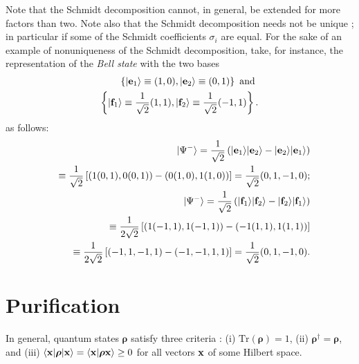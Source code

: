 Note that the Schmidt decomposition cannot, in general, be extended for more factors than two.
Note also that the Schmidt decomposition needs not be unique \cite{ekert:415};
in particular if some of the Schmidt coefficients $\sigma_i$ are equal.
For the sake of an example of nonuniqueness of the Schmidt decomposition,
take, for instance, the representation of the {\em Bell state} 
with the two bases
\begin{equation}
\begin{split}
\left\{
\vert {\bf e}_1\rangle \equiv (1,0),
\vert {\bf e}_2\rangle \equiv (0,1)
\right\}
\textrm{ and }\\
\left\{
\vert {\bf f}_1\rangle \equiv \frac{1}{\sqrt{2}}(1,1),
\vert {\bf f}_2\rangle \equiv \frac{1}{\sqrt{2}}(-1,1)
\right\}.
\end{split}
\end{equation}
as follows:
\begin{equation}
\begin{split}
\vert {\Psi^-} \rangle =
\frac{1}{\sqrt{2}}
\left(
\vert {\bf e}_1\rangle
\vert {\bf e}_2\rangle
-
\vert {\bf e}_2\rangle
\vert {\bf e}_1\rangle
\right)\\
\quad \equiv
\frac{1}{\sqrt{2}}
\left[
(1 (0,1),0(0,1))- (0 (1,0),1(1,0))\right] = \frac{1}{\sqrt{2}} (0,1,-1,0); \\
\vert {\Psi^-} \rangle =
\frac{1}{\sqrt{2}}
\left(
\vert {\bf f}_1\rangle
\vert {\bf f}_2\rangle
-
\vert {\bf f}_2\rangle
\vert {\bf f}_1\rangle
\right) \\
\quad \equiv
\frac{1}{2\sqrt{2}}
\left[
(1 (-1,1),1(-1,1))- ( -1 (1,1),1(1,1))\right]  \\
\quad \equiv
\frac{1}{2\sqrt{2}}
\left[
( -1  , 1 ,-1 ,1 ) - ( -1,-1 ,1 ,1 )\right]
 = \frac{1}{\sqrt{2}} (0,1,-1,0)
.
\end{split}
\end{equation}



\section{Purification}


In general, quantum states ${\boldsymbol{\rho}}$ satisfy three criteria \cite{ba-89}:
(i)
$\textrm{Tr}({\boldsymbol{\rho}}) =1$,
(ii) ${\boldsymbol{\rho}}^\dagger ={\boldsymbol{\rho}}$, and
(iii)
$
\langle {\bf x} \vert {\boldsymbol{\rho}} \vert {\bf x} \rangle
=\langle {\bf x} \vert {\boldsymbol{\rho}}  {\bf x} \rangle \ge  0
$ for all vectors ${\bf x}$ of some  Hilbert space.

